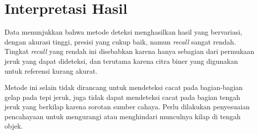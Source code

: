 \documentclass[laporan.tex]{subfiles}
\begin{document}
\section{Interpretasi Hasil}

Data menunjukkan bahwa metode deteksi menghasilkan hasil yang bervariasi, dengan akurasi tinggi, presisi yang cukup baik, namun \emph{recall} sangat rendah. Tingkat \emph{recall} yang rendah ini disebabkan karena hanya sebagian dari permukaan jeruk yang dapat dideteksi, dan terutama karena citra biner yang digunakan untuk referensi kurang akurat.

Metode ini selain tidak dirancang untuk mendeteksi cacat pada bagian-bagian gelap pada tepi jeruk, juga tidak dapat mendeteksi cacat pada bagian tengah jeruk yang berkilap karena sorotan sumber cahaya. Perlu dilakukan penyesuaian pencahayaan untuk mengurangi atau menghindari munculnya kilap di tengah objek.


\end{document}
